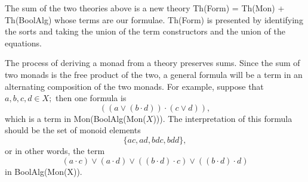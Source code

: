 \documentclass{llncs}
\newcommand{\maps}{\colon}
\renewcommand{\:}{\colon}
\begin{document}
The sum of the two theories above is a new theory Th(Form) = Th(Mon) + Th(BoolAlg) whose terms are our formulae.  Th(Form) is presented by identifying the sorts and taking the union of the term constructors and the union of the equations.
\begin{comment}
  \begin{longtable}{|p{0.3\linewidth}|p{0.7\linewidth}|}
    \hline
    Sorts:
    \begin{itemize}
      \item $S$
    \end{itemize}
    Term constructors:
    \begin{itemize}
      \item $\cdot\maps S^2 \to S$
      \item $e\maps 1 \to S$
      \item $\land, \lor\maps S^2 \to S$
      \item $\top, \bot\maps 1 \to S$
      \item $\neg\maps S \to S$
    \end{itemize}
    &
    Equations:
    \begin{itemize}
      \item associativity and unit laws for $\cdot$
      \item \raggedright associativity, commutativity, and unit laws for $\land$ and $\lor$
      \item involution for $\neg$
      \item de Morgan's laws
    \end{itemize}\\
    \hline
  \end{longtable}
\end{comment}

The process of deriving a monad from a theory preserves sums.  Since the sum of two monads is the free product of the two, a general formula will be a term in an alternating composition of the two monads.  For example, suppose that $a, b, c, d \in X;$ then one formula is
\[ (({a}\lor{(b \cdot d)}) \cdot ({c}\lor{d})), \]
which is a term in Mon(BoolAlg(Mon($X$))).  The interpretation of this formula should be the set of monoid elements
\[ \{ ac, ad, bdc, bdd \}, \]
or in other words, the term
\[ (a \cdot c) \lor (a \cdot d) \lor ((b \cdot d) \cdot c) \lor ((b \cdot d) \cdot d) \]
in BoolAlg(Mon(X)).
\end{document}
